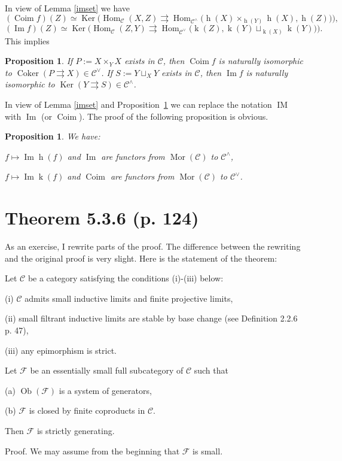 \documentclass[12pt]{article}
\newtheorem{prop}[thm]{Proposition}
\theoremstyle{remark}%
\newcommand{\n}{\noindent}
\newcommand{\C}{\mathcal C}
\newcommand{\F}{\mathcal F}
\newcommand{\pa}{\rightrightarrows}
\newcommand{\pr}{Proposition}
\DeclareMathOperator{\Coim}{Coim}
\DeclareMathOperator{\Coker}{Coker}
\DeclareMathOperator{\Ima}{Im}
\DeclareMathOperator{\IM}{IM}
\DeclareMathOperator{\hy}{h}
\DeclareMathOperator{\ky}{k}
\DeclareMathOperator{\h}{Hom}
\DeclareMathOperator{\Ker}{Ker}
\DeclareMathOperator{\Mor}{Mor}
\DeclareMathOperator{\Ob}{Ob}
\begin{document}
In view of Lemma \ref{imset} we have 
$$ 
(\Coim f)(Z)\simeq\Ker\Big(\h_\C(X,Z)\pa\h_{\C^\wedge}\big(\hy(X)\times_{\hy(Y)}\hy(X),\hy(Z)\big)\Big), 
$$ 
$$ 
(\Ima f)(Z)\simeq\Ker\Big(\h_\C(Z,Y)\pa\h_{\C^\vee}\big(\ky(Z),\ky(Y)\sqcup_{\ky(X)}\ky(Y)\big)\Big). 
$$ 
This implies 
% 
\begin{prop}\label{coimim}
If $P:=X\times_YX$ exists in $\C$, then $\Coim f$ is naturally isomorphic to $\Coker(P\pa X)\in\C^\vee$. If $S:=Y\sqcup_XY$ exists in $\C$, then $\Ima f$ is naturally isomorphic to $\Ker(Y\pa S)\in\C^\wedge$. 
\end{prop} 
%  

In view of Lemma \ref{imset} and \pr\ \ref{coimim} we can replace the notation $\IM$ with $\Ima$ (or $\Coim$). The proof of the following proposition is obvious. 
% 
\begin{prop}\label{fun}
We have: 

$f\mapsto\Ima\hy(f)$ and $\Ima$ are functors from $\Mor(\C)$ to $\C^\wedge$, 

$f\mapsto\Ima\ky(f)$ and $\Coim$ are functors from $\Mor(\C)$ to $\C^\vee$. 
% 
\end{prop} 
% 
\section{Theorem 5.3.6 (p. 124)}%
% 
As an exercise, I rewrite parts of the proof. The difference between the rewriting and the original proof is very slight. Here is the statement of the theorem:\bigskip

\centerline *

\n Let $\C$ be a category satisfying the conditions (i)-(iii) below:

\n (i) $\C$ admits small inductive limits and finite projective limits, 

\n (ii) small filtrant inductive limits are stable by base change (see Definition 2.2.6 p. 47), 

\n (iii) any epimorphism is strict.

\n Let $\F$ be an essentially small full subcategory of $\C$ such that 

\n (a) $\Ob(\F)$ is a system of generators,

\n (b) $\F$ is closed by finite coproducts in $\C$. 

\n Then $\F$ is strictly generating.

\centerline *

\n Proof. We may assume from the beginning that $\F$ is small.
\end{document}
